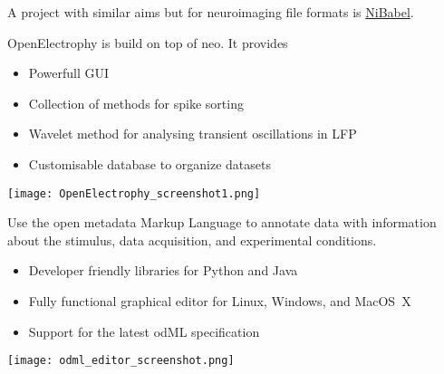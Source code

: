 \begin{multicols}{3}
A project with similar aims but for neuroimaging file formats is
\href{http://www.nipy.org/nibabel}{NiBabel}.




OpenElectrophy is build on top of neo.  It provides

\begin{itemize}[nolistsep,topsep=0em,leftmargin=1pc]
\item Powerfull GUI
\item Collection of methods for spike sorting
\item Wavelet method for analysing transient oscillations in LFP
\item Customisable database to organize datasets
\end{itemize}

\texttt{[image: OpenElectrophy\_screenshot1.png]}


%


Use the {open metadata Markup Language} to annotate data with information about the stimulus, data acquisition, and experimental conditions.

\begin{itemize}[nolistsep,topsep=0em,leftmargin=1pc]
\item Developer friendly libraries for Python and Java
\item Fully functional graphical editor for Linux, Windows, and MacOS~X
\item Support for the latest odML specification
\end{itemize}

\texttt{[image: odml\_editor\_screenshot.png]}

%


\end{multicols}
